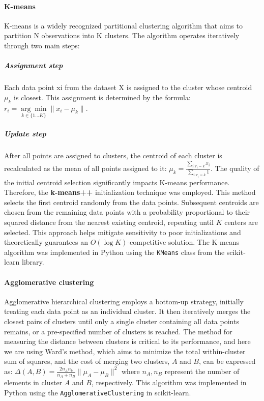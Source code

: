\documentclass{article}
\begin{document}
\paragraph{K-means} K-means is a widely recognized partitional clustering algorithm that aims to partition N observations into K clusters. The algorithm operates iteratively through two main steps:

\subparagraph{Assignment step} Each data point xi from the dataset X is assigned to the cluster whose centroid $\mu_k$ is closest. This assignment is determined by the formula: $r_i = \underset{k\in \{1\ldots K\} }{\arg\min}{ \|x_{i}-\mu_k\| }$.

\subparagraph{Update step} After all points are assigned to clusters, the centroid of each cluster is recalculated as the mean of all points assigned to it: $\mu_k = \frac{\sum_{i:r_i=k}^{} x_i}{\sum_{i:r_i=k}^{} 1}$. The quality of the initial centroid selection significantly impacts K-means performance. Therefore, the \textbf{k-means++} initialization technique was employed. This method selects the first centroid randomly from the data points. Subsequent centroids are chosen from the remaining data points with a probability proportional to their squared distance from the nearest existing centroid, repeating until $K$ centers are selected. This approach helps mitigate sensitivity to poor initializations and theoretically guarantees an $O(\log K)$-competitive solution. The K-means algorithm was implemented in Python using the \texttt{KMeans} class from the scikit-learn library.

\paragraph{Agglomerative clustering} Agglomerative hierarchical clustering employs a bottom-up strategy, initially treating each data point as an individual cluster. It then iteratively merges the closest pairs of clusters until only a single cluster containing all data points remains, or a pre-specified number of clusters is reached. The method for measuring the distance between clusters is critical to its performance, and here we are using Ward's method, which aims to minimize the total within-cluster sum of squares, and the cost of merging two clusters, $A$ and $B$, can be expressed as: $\Delta(A, B)=\frac{2n_An_b}{n_A+n_B}\|\mu_A-\mu_B\|^2$ where $n_A, n_B$ represent the number of elements in cluster $A$ and $B$, respectively. This algorithm was implemented in Python using the \texttt{AgglomerativeClustering} in scikit-learn.
\end{document}
